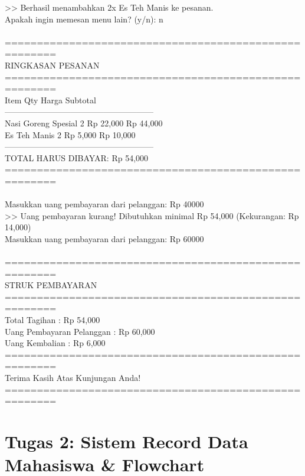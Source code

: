 \documentclass[12pt,a4paper]{article}
\begin{document}
\begin{tcolorbox}[colback=black!90!white,coltext=green!90!white,fontupper=\ttfamily\footnotesize,title=\textbf{Terminal Output: Eksekusi Python Kasir Rumah Makan}]
>> Berhasil menambahkan 2x Es Teh Manis ke pesanan.\\
Apakah ingin memesan menu lain? (y/n): n\\
\\
======================================================\\
                   RINGKASAN PESANAN                  \\
======================================================\\
Item                    Qty         Harga    Subtotal\\
------------------------------------------------------\\
Nasi Goreng Spesial     2        Rp 22,000  Rp 44,000\\
Es Teh Manis            2        Rp  5,000  Rp 10,000\\
------------------------------------------------------\\
TOTAL HARUS DIBAYAR:                        Rp 54,000\\
======================================================\\
\\
Masukkan uang pembayaran dari pelanggan: Rp 40000\\
>> Uang pembayaran kurang! Dibutuhkan minimal Rp 54,000 (Kekurangan: Rp 14,000)\\
Masukkan uang pembayaran dari pelanggan: Rp 60000\\
\\
======================================================\\
                   STRUK PEMBAYARAN                   \\
======================================================\\
Total Tagihan                 : Rp 54,000\\
Uang Pembayaran Pelanggan     : Rp 60,000\\
Uang Kembalian                : Rp 6,000\\
======================================================\\
          Terima Kasih Atas Kunjungan Anda!          \\
======================================================
\end{tcolorbox}

\newpage

\section{Tugas 2: Sistem Record Data Mahasiswa \& Flowchart}
\end{document}

